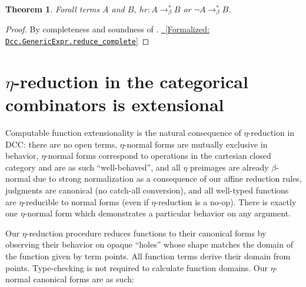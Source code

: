 \documentclass{article}
\newcommand{\lean}[1]{\EscVerb{#1}}
\newtheorem{theorem}{Theorem}
\newcommand{\leanlink}[2]{
  \hfill \href{#1}{\textcolor{leanblue}\faCheckSquare~[Formalized: \texttt{#2}]}%
}
\newcommand{\arr}{\rightarrow}
\newcommand{\barr}{\arr_{\beta}}
\begin{document}
\begin{theorem} \label{thm:reddecide}
  Forall terms \(A\) and \(B\), \(hr : A \barr^{*} B\) or \(\neg A \barr^{*} B\).
\end{theorem}

\begin{proof}
  By completeness and soundness of \lean{reduce RedAff}. \hfill \leanlink{https://github.com/lexzaiello/DCC/blob/05b05784d7e7b2e9070a7edbd6b024f613c80448/Dcc/Aff/Red.lean\#L582}{Dcc.GenericExpr.reduce\_complete}
\end{proof}

\section{\(\eta\)-reduction in the categorical combinators is extensional}

Computable function extensionality is the natural consequence of \(\eta\)-reduction in DCC: there are no open terms, \(\eta\)-normal forms are mutually exclusive in behavior, \(\eta\)-normal forms correspond to operations in the cartesian closed category and are as such ``well-behaved'', and all \(\eta\) preimages are already \(\beta\)-normal due to strong normalization as a consequence of our affine reduction rules, judgments are canonical (no catch-all conversion), and all well-typed functions are \(\eta\)-reducible to normal forms (even if \(\eta\)-reduction is a no-op). There is exactly one \(\eta\)-normal form which demonstrates a particular behavior on any argument.

Our \(\eta\)-reduction procedure reduces functions to their canonical forms by observing their behavior on opaque ``holes'' whose shape matches the domain of the function given by term points. All function terms derive their domain from points. Type-checking is not required to calculate function domains. Our \(\eta\)-normal canonical forms are as such:
\end{document}
